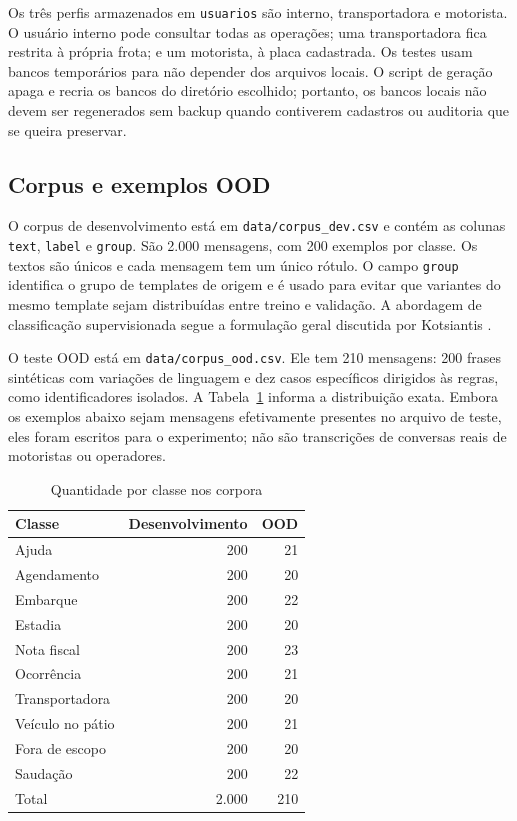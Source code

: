 \documentclass[conference]{IEEEtran}
\begin{document}
Os três perfis armazenados em \texttt{usuarios} são interno, transportadora e motorista. O usuário interno pode consultar todas as operações; uma transportadora fica restrita à própria frota; e um motorista, à placa cadastrada. Os testes usam bancos temporários para não depender dos arquivos locais. O script de geração apaga e recria os bancos do diretório escolhido; portanto, os bancos locais não devem ser regenerados sem backup quando contiverem cadastros ou auditoria que se queira preservar.

\subsection{Corpus e exemplos OOD}

O corpus de desenvolvimento está em \texttt{data/corpus\_dev.csv} e contém as colunas \texttt{text}, \texttt{label} e \texttt{group}. São 2.000 mensagens, com 200 exemplos por classe. Os textos são únicos e cada mensagem tem um único rótulo. O campo \texttt{group} identifica o grupo de templates de origem e é usado para evitar que variantes do mesmo template sejam distribuídas entre treino e validação. A abordagem de classificação supervisionada segue a formulação geral discutida por Kotsiantis \cite{kotsiantis}.

O teste OOD está em \texttt{data/corpus\_ood.csv}. Ele tem 210 mensagens: 200 frases sintéticas com variações de linguagem e dez casos específicos dirigidos às regras, como identificadores isolados. A Tabela~\ref{tab:counts} informa a distribuição exata. Embora os exemplos abaixo sejam mensagens efetivamente presentes no arquivo de teste, eles foram escritos para o experimento; não são transcrições de conversas reais de motoristas ou operadores.

\begin{table}[t]
\centering
\caption{Quantidade por classe nos corpora}
\label{tab:counts}
\scriptsize
\begin{tabular}{lrr}
\toprule
Classe & Desenvolvimento & OOD \\
\midrule
Ajuda & 200 & 21 \\
Agendamento & 200 & 20 \\
Embarque & 200 & 22 \\
Estadia & 200 & 20 \\
Nota fiscal & 200 & 23 \\
Ocorrência & 200 & 21 \\
Transportadora & 200 & 20 \\
Veículo no pátio & 200 & 21 \\
Fora de escopo & 200 & 20 \\
Saudação & 200 & 22 \\
\midrule
Total & 2.000 & 210 \\
\bottomrule
\end{tabular}
\end{table}
\end{document}
